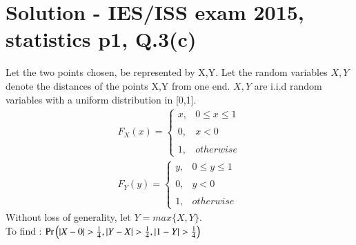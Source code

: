\documentclass[journal,12pt,twocolumn]{IEEEtran}
\begin{document}
\section*{Solution - IES/ISS exam 2015, statistics p1, Q.3(c)}
\begin{comment}
Let the random variable $X\in\{1,2\}$ represent the type of the chosen bulb. $X=1$ denotes a Type 1 bulb, while $X=2$ denotes a Type 2 bulb. Given,
\begin{align}
\tag{5.1}
    n(X=1)=n(X=2)\\
\tag{5.2}\Rightarrow p_{X}(1)=p_{X}(2)=\dfrac{1}{2}
\end{align}
Let the random variable $Y\in\{0,1\}$ represent if a bulb lasts more than 100 hours. $Y=1$ denotes that it lasts, while $Y=0$ denotes that it doesn't. Given, 
\begin{align}
\tag{5.3}
    p_{Y|X}(1|1)=0.7\\
\tag{5.4}
    p_{Y|X}(1|2)=0.4
\end{align}
To find : $p_{Y}(1)$
\begin{align}
\tag{5.5}
p_{Y}(1)&=p_{Y|X}(1|1)p_{X}(1)+p_{Y|X}(1|2)p_{X}(2)\\
\tag{5.6}
&p_{Y}(1)=(0.7)(0.5)+(0.4)(0.5)\\
\tag{5.7}
&\therefore p_{Y}(1)=0.55
\end{align}
\end{comment}
Let the two points chosen, be represented by X,Y. Let the random variables $X,Y$ denote the distances of the points X,Y from one end. $X,Y$ are i.i.d random variables with a uniform distribution in [0,1].
\begin{align}
    F_{X}(x)=\begin{cases}
	x, & 0\leq x\leq1 \\~\\[-1em]
	0, & x<0\\~\\[-1em]
	1, & otherwise
	\end{cases}\\
	F_{Y}(y)=\begin{cases}
	y, & 0\leq y\leq1 \\~\\[-1em]
	0, & y<0\\~\\[-1em]
	1, & otherwise
	\end{cases}
\end{align}
Without loss of generality, let $Y=max\{X,Y\}$.\\
To find : $\pr{|X-0|>\frac{1}{4},|Y-X|>\frac{1}{4},|1-Y|>\frac{1}{4}}$\\
\end{document}
